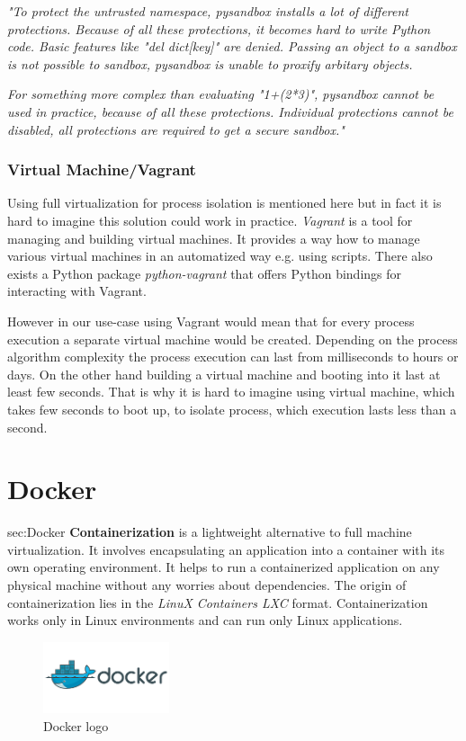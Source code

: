 \textit{
"To protect the untrusted namespace, pysandbox installs a lot of
different protections. Because of all these protections, it becomes
hard to write Python code. Basic features like "del dict[key]" are
denied. Passing an object to a sandbox is not possible to sandbox,
pysandbox is unable to proxify arbitary objects.}

\textit{
For something more complex than evaluating "1+(2*3)", pysandbox cannot
be used in practice, because of all these protections. Individual
protections cannot be disabled, all protections are required to get a
secure sandbox."}

\subsubsection{Virtual Machine/Vagrant}
Using full virtualization for process isolation is mentioned here but in fact it is hard to imagine this solution could work
in practice. \textit{Vagrant} is a tool for managing and building virtual machines. It provides a way how to manage various virtual 
machines in an automatized way e.g. using scripts. There also exists a Python package \textit{python-vagrant} that offers 
Python bindings for interacting with Vagrant.

However in our use-case using Vagrant would mean that for every process execution a separate virtual machine would
be created. Depending
on the process algorithm complexity the process execution can last from milliseconds to hours or days. On the other hand building 
a virtual machine and booting into it last at least few seconds. That is why it is hard to imagine using virtual machine, which takes
few seconds to boot up, to isolate process, which execution lasts less than a second.

\newpage
\section{Docker}
{sec:Docker}
\textbf{Containerization} is a lightweight alternative to full machine virtualization. It involves encapsulating an application 
into a container with its own operating environment. It helps to run a containerized application on any physical machine without any
worries about dependencies. The origin of containerization lies in the \textit{LinuX Containers {LXC}} format. Containerization
works only in Linux environments and can run only Linux applications.

\begin{figure}[h!]
\centering
\includegraphics[width=0.33\textwidth]{img/Docker_logo}
\caption{Docker logo}
\label{fig:Docker_logo}
\end{figure}

